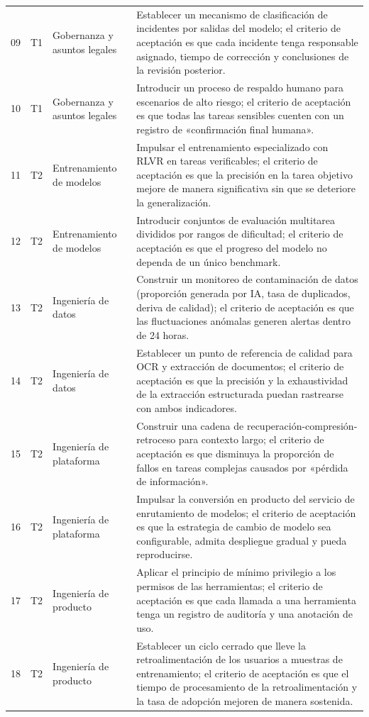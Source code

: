 \documentclass[a4paper]{article}
\begin{document}
\begin{longtable}{p{}p{}p{}p{}}
09 & T1 & Gobernanza y asuntos legales & Establecer un mecanismo de clasificación de incidentes por salidas del modelo; el criterio de aceptación es que cada incidente tenga responsable asignado, tiempo de corrección y conclusiones de la revisión posterior. \\
10 & T1 & Gobernanza y asuntos legales & Introducir un proceso de respaldo humano para escenarios de alto riesgo; el criterio de aceptación es que todas las tareas sensibles cuenten con un registro de «confirmación final humana». \\
11 & T2 & Entrenamiento de modelos & Impulsar el entrenamiento especializado con RLVR en tareas verificables; el criterio de aceptación es que la precisión en la tarea objetivo mejore de manera significativa sin que se deteriore la generalización. \\
12 & T2 & Entrenamiento de modelos & Introducir conjuntos de evaluación multitarea divididos por rangos de dificultad; el criterio de aceptación es que el progreso del modelo no dependa de un único benchmark. \\
13 & T2 & Ingeniería de datos & Construir un monitoreo de contaminación de datos (proporción generada por IA, tasa de duplicados, deriva de calidad); el criterio de aceptación es que las fluctuaciones anómalas generen alertas dentro de 24 horas. \\
14 & T2 & Ingeniería de datos & Establecer un punto de referencia de calidad para OCR y extracción de documentos; el criterio de aceptación es que la precisión y la exhaustividad de la extracción estructurada puedan rastrearse con ambos indicadores. \\
15 & T2 & Ingeniería de plataforma & Construir una cadena de recuperación-compresión-retroceso para contexto largo; el criterio de aceptación es que disminuya la proporción de fallos en tareas complejas causados por «pérdida de información». \\
16 & T2 & Ingeniería de plataforma & Impulsar la conversión en producto del servicio de enrutamiento de modelos; el criterio de aceptación es que la estrategia de cambio de modelo sea configurable, admita despliegue gradual y pueda reproducirse. \\
17 & T2 & Ingeniería de producto & Aplicar el principio de mínimo privilegio a los permisos de las herramientas; el criterio de aceptación es que cada llamada a una herramienta tenga un registro de auditoría y una anotación de uso. \\
18 & T2 & Ingeniería de producto & Establecer un ciclo cerrado que lleve la retroalimentación de los usuarios a muestras de entrenamiento; el criterio de aceptación es que el tiempo de procesamiento de la retroalimentación y la tasa de adopción mejoren de manera sostenida. \\

\end{longtable}
\end{document}
